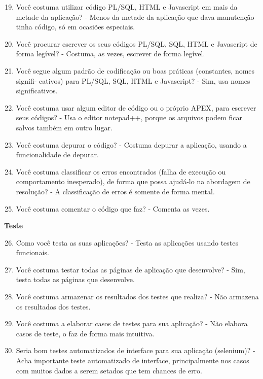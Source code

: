 \begin{anexosenv}
\begin{enumerate}
\setcounter{enumi}{18}
\item Você costuma utilizar código PL/SQL, HTML e Javascript em mais da metade da
aplicação?\newline
- Menos da metade da aplicação que dava manutenção tinha código, só em ocasiões especiais.
\item Você procurar escrever os seus códigos PL/SQL, SQL, HTML e Javascript de forma
legível?\newline
- Costuma, as vezes, escrever de forma legível.
\item Você segue algum padrão de codificação ou boas práticas (constantes, nomes signifi-
cativos) para PL/SQL, SQL, HTML e Javascript?\newline
- Sim, usa nomes significativos.
\item Você costuma usar algum editor de código ou o próprio APEX, para escrever seus
códigos?\newline
- Usa o editor notepad++, porque os arquivos podem ficar salvos também em outro lugar.
\item Você costuma depurar o código?\newline
- Costuma depurar a aplicação, usando a funcionalidade de depurar.
\item Você costuma classificar os erros encontrados (falha de execução ou comportamento
inesperado), de forma que possa ajudá-lo na abordagem de resolução?\newline
- A classificação de erros é somente de forma mental.
\item Você costuma comentar o código que faz?\newline
- Comenta as vezes.
\end{enumerate}

\textbf{Teste}

\begin{enumerate}
\setcounter{enumi}{25}
\item Como você testa as suas aplicações?\newline
- Testa as aplicações usando testes funcionais.
\item Você costuma testar todas as páginas de aplicação que desenvolve?\newline
- Sim, testa todas as páginas que desenvolve.
\item Você costuma armazenar os resultados dos testes que realiza?\newline
- Não armazena os resultados dos testes.
\item Você costuma a elaborar casos de testes para sua aplicação?\newline
- Não elabora casos de teste, o faz de forma mais intuitiva.
\item Seria bom testes automatizados de interface para sua aplicação (selenium)?\newline
- Acha importante teste automatizado de interface, principalmente nos casos com muitos dados a serem setados que tem chances de erro.
\end{enumerate}


\end{anexosenv}
